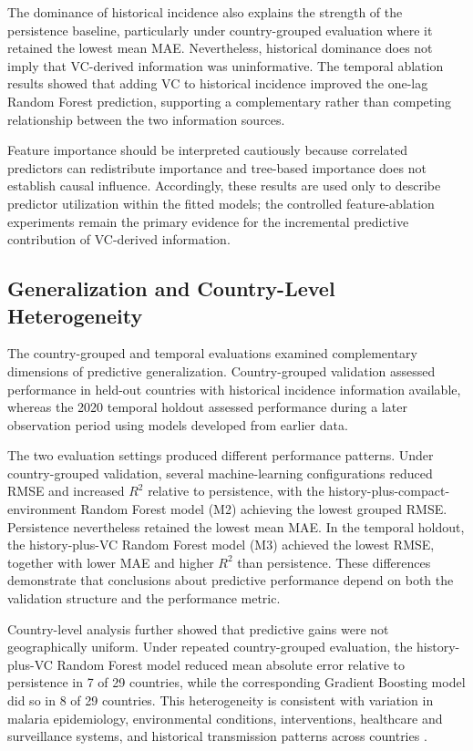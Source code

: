 \documentclass[10pt,twocolumn]{article}
\begin{document}
The dominance of historical incidence also explains the strength of
the persistence baseline, particularly under country-grouped
evaluation where it retained the lowest mean MAE. Nevertheless,
historical dominance does not imply that VC-derived information was
uninformative. The temporal ablation results showed that adding VC to
historical incidence improved the one-lag Random Forest prediction,
supporting a complementary rather than competing relationship between
the two information sources.

Feature importance should be interpreted cautiously because correlated
predictors can redistribute importance and tree-based importance does
not establish causal influence. Accordingly, these results are used
only to describe predictor utilization within the fitted models; the
controlled feature-ablation experiments remain the primary evidence
for the incremental predictive contribution of VC-derived information.


\subsection{Generalization and Country-Level Heterogeneity}

The country-grouped and temporal evaluations examined complementary
dimensions of predictive generalization. Country-grouped validation
assessed performance in held-out countries with historical incidence
information available, whereas the 2020 temporal holdout assessed
performance during a later observation period using models developed
from earlier data.

The two evaluation settings produced different performance patterns.
Under country-grouped validation, several machine-learning
configurations reduced RMSE and increased \(R^2\) relative to
persistence, with the history-plus-compact-environment Random Forest
model (M2) achieving the lowest grouped RMSE. Persistence nevertheless
retained the lowest mean MAE. In the temporal holdout, the
history-plus-VC Random Forest model (M3) achieved the lowest RMSE,
together with lower MAE and higher \(R^2\) than persistence. These
differences demonstrate that conclusions about predictive performance
depend on both the validation structure and the performance metric.

Country-level analysis further showed that predictive gains were not
geographically uniform. Under repeated country-grouped evaluation,
the history-plus-VC Random Forest model reduced mean absolute error
relative to persistence in 7 of 29 countries, while the corresponding
Gradient Boosting model did so in 8 of 29 countries. This
heterogeneity is consistent with variation in malaria epidemiology,
environmental conditions, interventions, healthcare and surveillance
systems, and historical transmission patterns across countries
\parencite{Odhiambo2020,Wu2023}.
\end{document}
